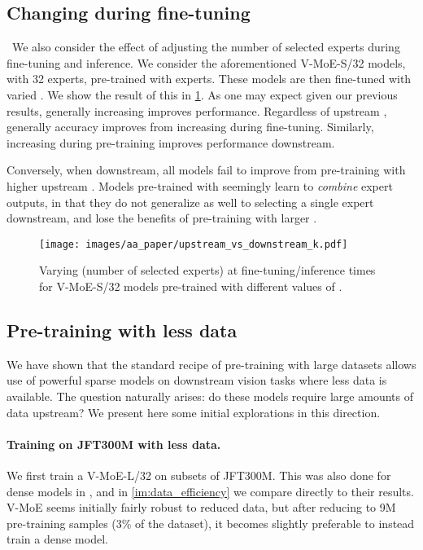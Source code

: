 \documentclass{article}
\newcommand{\abbv}{{V-MoE}}
\begin{document}
\subsection{Changing \texorpdfstring{}{k} during fine-tuning}\
We also consider the effect of adjusting the number of selected experts during fine-tuning and inference. We consider the aforementioned \abbv{}-S/32 models, with 32 experts, pre-trained with  experts. These models are then fine-tuned with varied . We show the result of this in \cref{im:vary_k_finetuning}.
As one may expect given our previous results, generally increasing  improves performance. Regardless of upstream , generally accuracy improves from increasing  during fine-tuning. Similarly, increasing  during pre-training improves performance downstream.

Conversely, when  downstream, all models fail to improve from pre-training with higher upstream . Models pre-trained with  seemingly learn to \textit{combine} expert outputs, in that they do not generalize as well to selecting a single expert downstream, and lose the benefits of pre-training with larger .

\begin{figure}[h]
\centering
\texttt{[image: images/aa\_paper/upstream\_vs\_downstream\_k.pdf]}
\caption{Varying  (number of selected experts) at fine-tuning/inference times for \abbv{}-S/32 models pre-trained with different values of .}
\label{im:vary_k_finetuning}
\end{figure}















\subsection{Pre-training with less data}
We have shown that the standard recipe of pre-training with large datasets allows use of powerful sparse models on downstream vision tasks where less data is available. The question naturally arises: do these models require large amounts of data upstream?
We present here some initial explorations in this direction.
\paragraph{Training on JFT300M with less data.}
We first train a \abbv{}-L/32 on subsets of JFT300M. This was also done for dense models in \cite{dosovitskiy2020image}, and in \cref{im:data_efficiency} we compare directly to their results. \abbv{} seems initially fairly robust to reduced data, but after reducing to 9M pre-training samples (3\% of the dataset), it becomes slightly preferable to instead train a dense model.
\end{document}
